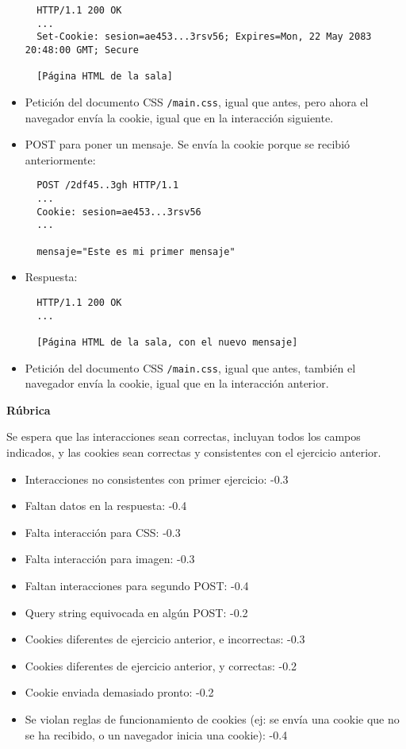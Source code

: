 \begin{itemize}
\begin{verbatim}
  HTTP/1.1 200 OK
  ...
  Set-Cookie: sesion=ae453...3rsv56; Expires=Mon, 22 May 2083 20:48:00 GMT; Secure

  [Página HTML de la sala]
\end{verbatim}

\item Petición del documento CSS \texttt{/main.css}, igual que antes, pero ahora el navegador envía la cookie, igual que en la interacción siguiente.

\item POST para poner un mensaje. Se envía la cookie porque se recibió anteriormente:

\begin{verbatim}
  POST /2df45..3gh HTTP/1.1
  ...
  Cookie: sesion=ae453...3rsv56
  ...

  mensaje="Este es mi primer mensaje"
\end{verbatim}
  
\item Respuesta:

\begin{verbatim}
  HTTP/1.1 200 OK
  ...

  [Página HTML de la sala, con el nuevo mensaje]
\end{verbatim}

\item Petición del documento CSS \texttt{/main.css}, igual que antes, también el navegador envía la cookie, igual que en la interacción anterior.
\end{itemize}

\vspace{.4cm}\textbf{Rúbrica}

Se espera que las interacciones sean correctas, incluyan todos los campos indicados, y las cookies sean correctas y consistentes con el ejercicio anterior.

\begin{itemize}
\item Interacciones no consistentes con primer ejercicio: -0.3
\item Faltan datos en la respuesta: -0.4
\item Falta interacción para CSS: -0.3
\item Falta interacción para imagen: -0.3
\item Faltan interacciones para segundo POST: -0.4
\item Query string equivocada en algún POST: -0.2
\item Cookies diferentes de ejercicio anterior, e incorrectas: -0.3
\item Cookies diferentes de ejercicio anterior, y correctas: -0.2
\item Cookie enviada demasiado pronto: -0.2
\item Se violan reglas de funcionamiento de cookies (ej: se envía una cookie que no se ha recibido, o un navegador inicia una cookie): -0.4
\end{itemize}

